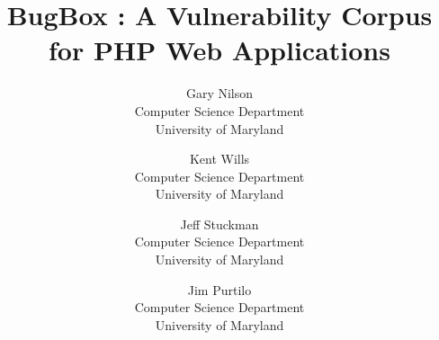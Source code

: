 \documentclass[letterpaper,twocolumn,10pt]{article}
\begin{document}
\date{}


\title{\Large \bf BugBox : A Vulnerability Corpus for PHP Web Applications}


\author{
{\rm Gary Nilson}\\
Computer Science Department\\University of Maryland
\and
{\rm Kent Wills}\\
Computer Science Department\\University of Maryland
\and
{\rm Jeff Stuckman}\\
Computer Science Department\\University of Maryland
\and
{\rm Jim Purtilo}\\
Computer Science Department\\University of Maryland
} %

\maketitle

\thispagestyle{empty}



 
\end{document}
